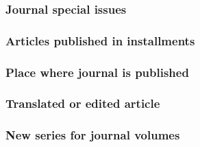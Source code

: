 \documentclass[11pt,letterpaper,oneside]{article}
\begin{document}
\begin{citebib}
\item \cite[81]{narr2015}
\item \cite[88--89]{narr2015}
\end{citebib}

\setcounter{subsubsection}{177}
\subsubsection{Journal special issues}

\begin{citebib}
\item \cite[351--81]{tezuka2013}
\end{citebib}

\setcounter{subsubsection}{179}
\subsubsection{Articles published in installments}

\begin{citebib}
\item \cite[312]{brown1978}
\end{citebib}

\setcounter{subsubsection}{181}
\subsubsection{Place where journal is published}

\begin{citebib}
\item \cite[65--70]{luu1999}
\item \cite{garrett1975}
\end{citebib}

\subsubsection{Translated or edited article}

\begin{citebib}
\item \cite{authorb}
\item \cite{authorc}
\end{citebib}

\subsubsection{New series for journal volumes}
\label{14.184}
\end{document}
